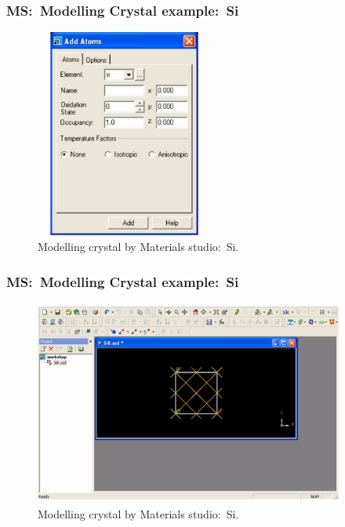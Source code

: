 \frame
{
	\frametitle{\textrm{MS:~Modelling Crystal example:~Si}}
\begin{figure}[h!]
\centering
\vspace*{-0.10in}
\includegraphics[height=2.70in,width=2.30in,viewport=0 0 546 747,clip]{Figures/MS-New_Project-10-Si_example.png}
\caption{\tiny \textrm{Modelling crystal by Materials studio:~Si.}}%
\label{MS-Modelling-Crystal-05}
\end{figure}
}

\frame
{
	\frametitle{\textrm{MS:~Modelling Crystal example:~Si}}
\begin{figure}[h!]
\centering
\vspace*{-0.10in}
\includegraphics[height=2.65in,width=4.00in,viewport=0 0 1090 698,clip]{Figures/MS-New_Project-11-Si_crystal.png}
\caption{\tiny \textrm{Modelling crystal by Materials studio:~Si.}}%
\label{MS-Modelling-Crystal-06}
\end{figure}
}

